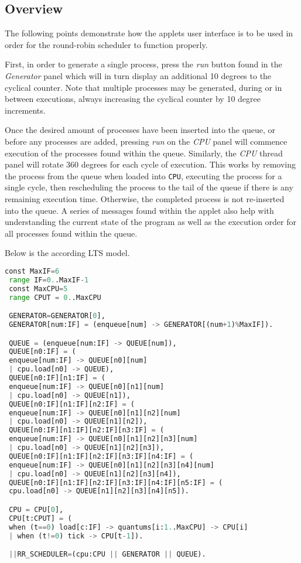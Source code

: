 \documentclass[]{report}
\begin{document}
\subsection*{Overview}
The following points demonstrate how the applets user interface is to be used in order for the round-robin scheduler to function properly. \par 
First, in order to generate a single process, press the \textit{run} button found in the \textit{Generator} panel which will in turn display an additional 10 degrees to the cyclical counter. Note that multiple processes may be generated, during or in between executions, always increasing the cyclical counter by 10 degree increments. \par 
Once the desired amount of processes have been inserted into the queue, or before any processes are added, pressing \textit{run} on the \textit{CPU} panel will commence execution of the processes found within the queue. Similarly, the \textit{CPU} thread panel will rotate 360 degrees for each cycle of execution. This works by removing the process from the queue when loaded into \verb|CPU|, executing the process for a single cycle, then rescheduling the process to the tail of the queue if there is any remaining execution time. Otherwise, the completed process is not re-inserted into the queue. A series of messages found within the applet also help with understanding the current state of the program as well as the execution order for all processes found within the queue. \par 
Below is the according LTS model. 
\vspace{2mm}
\begin{lstlisting}[language=Python, frame=l]
 const MaxIF=6
 range IF=0..MaxIF-1
 const MaxCPU=5
 range CPUT = 0..MaxCPU 

 GENERATOR=GENERATOR[0],
 GENERATOR[num:IF] = (enqueue[num] -> GENERATOR[(num+1)%MaxIF]).

 QUEUE = (enqueue[num:IF] -> QUEUE[num]),
 QUEUE[n0:IF] = (
 enqueue[num:IF] -> QUEUE[n0][num]
 | cpu.load[n0] -> QUEUE),
 QUEUE[n0:IF][n1:IF] = (
 enqueue[num:IF] -> QUEUE[n0][n1][num]
 | cpu.load[n0] -> QUEUE[n1]),
 QUEUE[n0:IF][n1:IF][n2:IF] = (
 enqueue[num:IF] -> QUEUE[n0][n1][n2][num]
 | cpu.load[n0] -> QUEUE[n1][n2]),
 QUEUE[n0:IF][n1:IF][n2:IF][n3:IF] = (
 enqueue[num:IF] -> QUEUE[n0][n1][n2][n3][num]
 | cpu.load[n0] -> QUEUE[n1][n2][n3]),
 QUEUE[n0:IF][n1:IF][n2:IF][n3:IF][n4:IF] = (
 enqueue[num:IF] -> QUEUE[n0][n1][n2][n3][n4][num]
 | cpu.load[n0] -> QUEUE[n1][n2][n3][n4]),
 QUEUE[n0:IF][n1:IF][n2:IF][n3:IF][n4:IF][n5:IF] = (
 cpu.load[n0] -> QUEUE[n1][n2][n3][n4][n5]).

 CPU = CPU[0],
 CPU[t:CPUT] = (
 when (t==0) load[c:IF] -> quantums[i:1..MaxCPU] -> CPU[i]
 | when (t!=0) tick -> CPU[t-1]).

 ||RR_SCHEDULER=(cpu:CPU || GENERATOR || QUEUE).
\end{lstlisting}
\end{document}
